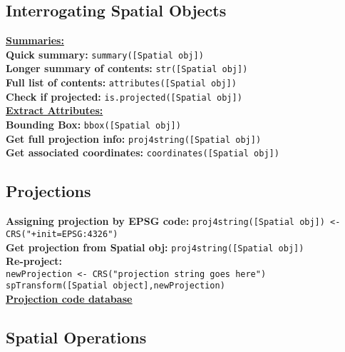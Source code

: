 \documentclass[10pt]{article}
\begin{document}
\hrulefill 
\subsection*{Interrogating Spatial Objects}
\underline{\textbf{Summaries:} }\\
\textbf{Quick summary:} \texttt{summary([Spatial obj])}\\
\textbf{Longer summary of contents:} \texttt{str([Spatial obj])}\\
\textbf{Full list of contents:} \texttt{attributes([Spatial obj])}\\
\textbf{Check if projected:} \texttt{is.projected([Spatial obj])}\\

\underline{\textbf{Extract Attributes:} }\\
\textbf{Bounding Box:} \texttt{bbox([Spatial obj])}\\
\textbf{Get full projection info:} \texttt{proj4string([Spatial obj])}\\
\textbf{Get associated coordinates:} \texttt{coordinates([Spatial obj])}\\


\hrulefill 
\subsection*{Projections}
\textbf{Assigning projection by EPSG code:} \texttt{proj4string([Spatial obj]) <-CRS("+init=EPSG:4326")}\\
\textbf{Get projection from Spatial obj:} \texttt{proj4string([Spatial obj])} \\
\textbf{Re-project:} \\
\hspace*{0.3cm}\texttt{newProjection <- CRS("projection string goes here")}\\
\hspace*{0.3cm}\texttt{spTransform([Spatial object],newProjection)}\\
\href{http://www.spatialreference.org/}{\underline{\textbf{Projection code database}}} \\


\hrulefill 
\subsection*{Spatial Operations}
\end{document}
